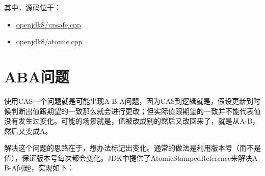 \documentclass[12pt]{article}
\begin{document}
其中，源码位于：

\begin{itemize}
\tightlist
\item
  \href{http://hg.openjdk.java.net/jdk8/jdk8/hotspot/file/tip/src/share/vm/prims/unsafe.cpp}{openjdk8/unsafe.cpp}
\item
  \href{http://hg.openjdk.java.net/jdk8/jdk8/hotspot/file/tip/src/share/vm/runtime/atomic.cpp}{openjdk8/atomic.cpp}
\end{itemize}

\section{ABA问题}\label{abaux95eeux9898}

使用CAS一个问题就是可能出现A-B-A问题，因为CAS到逻辑就是，假设更新到时候判断出值跟期望的一致那么就会进行更改；但实际值跟期望的一致并不能代表值没有发生过变化。可能的场景就是，值被改成别的然后又改回来了，就是从A-B，然后又变成A。

解决这个问题的思路在于，想办法标记出变化。通常的做法是利用版本号（而不是值），保证版本号每次都会变化。JDK中提供了AtomicStampedReference来解决A-B-A问题，实现如下：

\begin{Shaded}
\begin{Highlighting}[]
   \OperatorTok{(}\OperatorTok{,}
\OperatorTok{,}
                              \OperatorTok{,}
                              \OperatorTok{)} \OperatorTok{\{}
\OperatorTok{\textless{}}\OperatorTok{\textgreater{}}\OperatorTok{=}\OperatorTok{;}
\OperatorTok{==} \OperatorTok{\&\&}
\OperatorTok{==} \OperatorTok{\&\&}
         \OperatorTok{((}\OperatorTok{==} \OperatorTok{\&\&}
\OperatorTok{==}\OperatorTok{)} \OperatorTok{||}
          \OperatorTok{(}\OperatorTok{,}\OperatorTok{(}\OperatorTok{,}\OperatorTok{)));}
 \OperatorTok{\}}
\end{Highlighting}
\end{Shaded}
\end{document}
